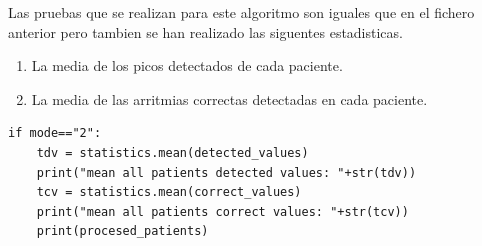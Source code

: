 Las pruebas que se realizan para este algoritmo son iguales que en el fichero anterior pero tambien
se han realizado las siguentes estadisticas.

\begin{enumerate}
	\item La media de los picos detectados de cada paciente.
	\item La media de las arritmias correctas detectadas en cada paciente.
\end{enumerate} 

\lstset{language=python, breaklines=true, basicstyle=\footnotesize}
\begin{lstlisting}[frame=single]
if mode=="2":
    tdv = statistics.mean(detected_values)
    print("mean all patients detected values: "+str(tdv))
    tcv = statistics.mean(correct_values)
    print("mean all patients correct values: "+str(tcv))
    print(procesed_patients)
\end{lstlisting}